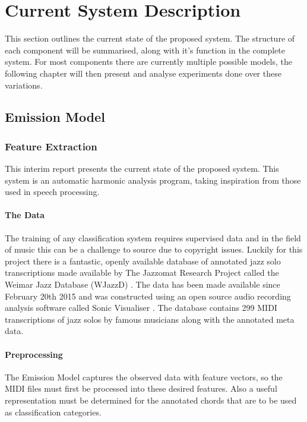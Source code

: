 \documentclass[bsc,singlespacing,parskip,deptreport]{infthesis}
\begin{document}
\chapter{Current System Description}

This section outlines the current state of the proposed system. The structure of each component will be summarised, along with it's function in the complete system. For most components there are currently multiple possible models, the following chapter will then present and analyse experiments done over these variations.

\section{Emission Model}

\subsection{Feature Extraction}
This interim report presents the current state of the proposed system. This system is an automatic harmonic analysis program, taking inspiration from those used in speech processing.
\subsubsection{The Data}

The training of any classification system requires supervised data and in the field of music this can be a challenge to source due to copyright issues. Luckily for this project there is a fantastic, openly available database of annotated jazz solo transcriptions made available by The Jazzomat Research Project called the Weimar Jazz Database (WJazzD) \cite{wjazz}. The data has been made available since February 20th 2015 and was constructed using an open source audio recording analysis software called Sonic Visualiser \cite{sv}. The database contains 299 MIDI transcriptions of jazz solos by famous musicians along with the annotated meta data.

\subsubsection{Preprocessing}

The Emission Model captures the observed data with feature vectors, so the MIDI files must first be processed into these desired features. Also a useful representation must be determined for the annotated chords that are to be used as classification categories.
\end{document}
